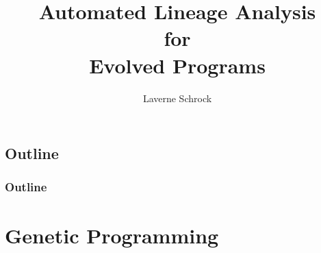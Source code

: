 \documentclass{beamer}
\title{Automated Lineage Analysis\\for\\Evolved Programs}
\author[Laverne Schrock]{Laverne Schrock}
\date[June 2016] %
\begin{document}
\begin{frame}
  \titlepage
\end{frame}


\subsection*{Outline}

\begin{frame}
  \frametitle{Outline}
  \tableofcontents
\end{frame}




  


\section{Genetic Programming}
\end{document}
